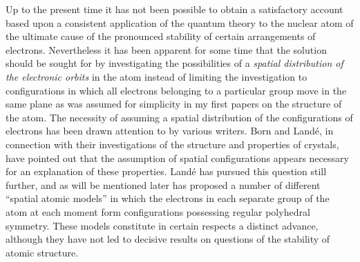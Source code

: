  Up to the present time it has not been
possible to obtain a satisfactory account based upon a consistent application
of the quantum theory to the nuclear atom of the ultimate
cause of the pronounced stability of certain arrangements of electrons.
Nevertheless it has been apparent for some time that the solution
should be sought for by investigating the possibilities of a \emph{spatial
distribution of the electronic orbits} in the atom instead of limiting
the investigation to configurations in which all electrons belonging
to a particular group move in the same plane as was assumed for
simplicity in my first papers on the structure of the atom. The
necessity of assuming a spatial distribution of the configurations
of electrons has been drawn attention to by various writers. Born
and Landé, in connection with their investigations of the structure
and properties of crystals, have pointed out that the assumption of
spatial configurations appears necessary for an explanation of these
properties. Landé has pursued this question still further, and as
will be mentioned later has proposed a number of different ``spatial
atomic models'' in which the electrons in each separate group of
the atom at each moment form configurations possessing regular
polyhedral symmetry. These models constitute in certain respects
a distinct advance, although they have not led to decisive results
on questions of the stability of atomic structure.

